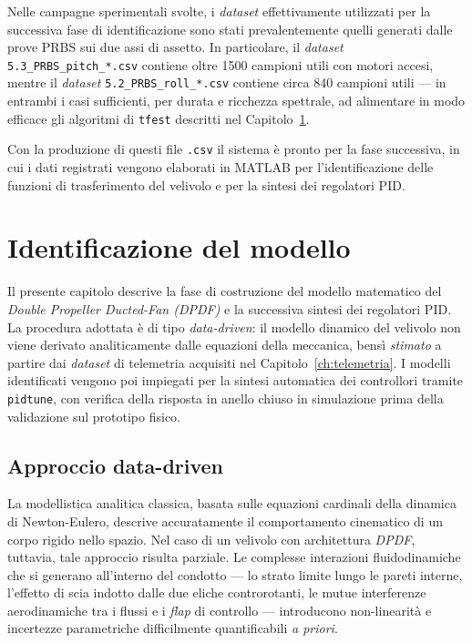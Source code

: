 \documentclass[11pt]{report}
\begin{document}
	Nelle campagne sperimentali svolte, i \textit{dataset} effettivamente utilizzati per la successiva fase di identificazione sono stati prevalentemente quelli generati dalle prove PRBS sui due assi di assetto. In particolare, il \textit{dataset} \texttt{5.3\_PRBS\_pitch\_*.csv} contiene oltre 1500 campioni utili con motori accesi, mentre il \textit{dataset} \texttt{5.2\_PRBS\_roll\_*.csv} contiene circa 840 campioni utili --- in entrambi i casi sufficienti, per durata e ricchezza spettrale, ad alimentare in modo efficace gli algoritmi di \texttt{tfest} descritti nel Capitolo~\ref{ch:modello}.
	
	Con la produzione di questi file \texttt{.csv} il sistema è pronto per la fase successiva, in cui i dati registrati vengono elaborati in MATLAB per l'identificazione delle funzioni di trasferimento del velivolo e per la sintesi dei regolatori PID.
\chapter{Identificazione del modello}
\label{ch:modello}

Il presente capitolo descrive la fase di costruzione del modello matematico del \textit{Double Propeller Ducted-Fan (DPDF)} e la successiva sintesi dei regolatori PID. La procedura adottata è di tipo \textit{data-driven}: il modello dinamico del velivolo non viene derivato analiticamente dalle equazioni della meccanica, bensì \textit{stimato} a partire dai \textit{dataset} di telemetria acquisiti nel Capitolo~\ref{ch:telemetria}. I modelli identificati vengono poi impiegati per la sintesi automatica dei controllori tramite \texttt{pidtune}, con verifica della risposta in anello chiuso in simulazione prima della validazione sul prototipo fisico.

\section{Approccio data-driven}
\label{sec:approccio_datadriven}

La modellistica analitica classica, basata sulle equazioni cardinali della dinamica di Newton-Eulero, descrive accuratamente il comportamento cinematico di un corpo rigido nello spazio. Nel caso di un velivolo con architettura \textit{DPDF}, tuttavia, tale approccio risulta parziale. Le complesse interazioni fluidodinamiche che si generano all'interno del condotto --- lo strato limite lungo le pareti interne, l'effetto di scia indotto dalle due eliche controrotanti, le mutue interferenze aerodinamiche tra i flussi e i \textit{flap} di controllo --- introducono non-linearità e incertezze parametriche difficilmente quantificabili \textit{a priori}.
\end{document}
